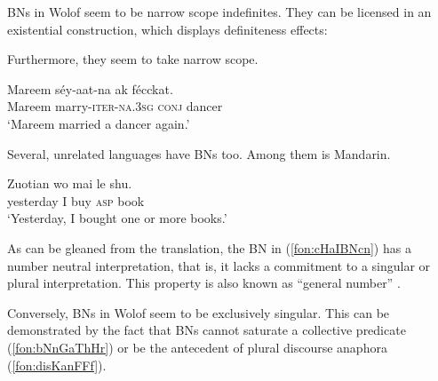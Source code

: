 \documentclass[output=paper]{langscibook}
\begin{document}
BNs in Wolof seem to be narrow scope indefinites. They can be licensed in an existential construction, which displays definiteness effects:
		
		\ea
			\label{fon:dogsgard}
			\z
		\z

\noindent   Furthermore, they seem to take narrow scope.
		
		\ea \gll	Mareem s\'{e}y-aat-na ak {f\'{e}cckat}.\\
		Mareem marry-\textsc{iter}-\textsc{na.3sg} \textsc{conj} dancer\\
		\glt    `Mareem married a dancer again.'\label{fon:aAtBAyzZBnN}
		\sn {}\label{fon:aAtBAyzZBnN1}
			\label{fon:aAtBAyzZBnN2}
			\z
		\z\label{fon:aAtBAyzZBnNOwlL}
		
\noindent Several, unrelated languages have BNs too. Among them is Mandarin.
		
    		\ea \gll	Zuotian wo mai le {shu}.\\
				yesterday I buy \textsc{asp} book\\
				\glt    `Yesterday, I bought one or more books.'
                \label{fon:cHaIBNcn}
		\z
		
\noindent   As can be gleaned from the translation, the BN in (\ref{fon:cHaIBNcn}) has a number neutral interpretation, that is, it lacks a commitment to a singular or plural interpretation. This property is also known as ``general number'' \citep{corbettNumber}. 
		
Conversely, BNs in Wolof seem to be exclusively singular. This can be demonstrated by the fact that BNs cannot saturate a collective predicate (\ref{fon:bNnGaThHr}) or be the antecedent of plural discourse anaphora (\ref{fon:disKanFFf}).
		
\end{document}
